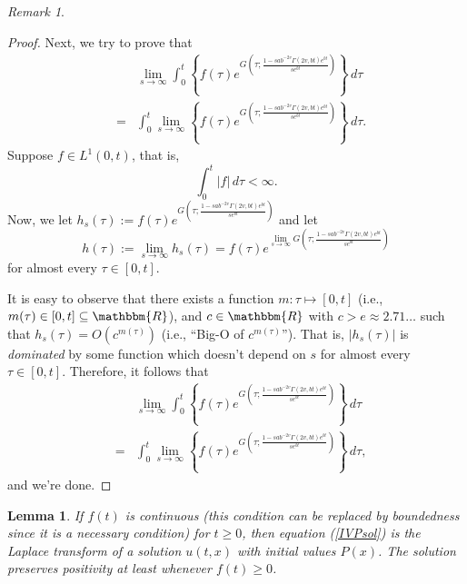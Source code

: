 \documentclass[preprint, 12pt]{elsarticle}
\numberwithin{equation}{section}
\theoremstyle{plain}
\newtheorem{lemma}{Lemma}[section]
\theoremstyle{remark}
\newtheorem{remark}{Remark}[section]
\newcommand{\assign}{:=}
\newcommand{\nocomma}{}
\begin{document}
\begin{remark}
\begin{proof}
Next, we try to prove that
\begin{eqnarray*} 
& & \lim_{s \rightarrow \infty} \int_0^t \left\{ f (\tau) e^{G \left( \tau ; \frac{1 - s a b^{- 2 v} \Gamma (2 v \nocomma, b t) e^{b t}}{s e^{bt}} \right)} \right\}\, d \tau\\ 
& = & \int_0^t \lim_{s \rightarrow \infty} \left\{ f (\tau) e^{G \left( \tau ; \frac{1 - s a b^{- 2 v} \Gamma (2 v \nocomma, b t) e^{b t}}{s e^{bt}} \right)} \right\}\, d \tau .
\end{eqnarray*}
Suppose $f \in L^1 (0, t)$, that is,
\[ \int_0^t | f |\, d \tau < \infty . \]
Now, we let $h_s (\tau) \assign f (\tau) e^{G \left( \tau ; \frac{1 - s a b^{- 2 v} \Gamma (2 v \nocomma, b t) e^{b t}}{s e^{bt}} \right)}$ and let
\[ h (\tau) \assign \lim_{s \rightarrow \infty} h_s (\tau) = f (\tau) e^{\lim_{s \rightarrow \infty} G \left( \tau ; \frac{1 - s a b^{- 2 v} \Gamma (2 v \nocomma, b t) e^{b t}}{s e^{bt}} \right)} \]
for almost every $\tau \in [0, t]$.
  
It is easy to observe that there exists a function $m : \tau \mapsto [0, t]$ (i.e., $m (\tau) \in [0, t] \subseteq \mathbbm{R}$), and $c \in \mathbbm{R}$ with $c > e \approx 2.71 \ldots$ such that $\displaystyle{h_s (\tau) = O (c^{m (\tau)})}$ (i.e., ``Big-O of $\displaystyle{c^{m (\tau)}}$''). That is, $| h_s (\tau) |$ is \emph{dominated} by some function which doesn't depend on $s$ for almost every $\tau \in [0, t]$. Therefore, it follows that
\begin{eqnarray*} 
& & \lim_{s \rightarrow \infty} \int_0^t \left\{ f (\tau) e^{G \left( \tau ; \frac{1 - s a b^{- 2 v} \Gamma (2 v \nocomma, b t) e^{b t}}{s e^{bt}} \right)} \right\}\, d \tau\\ 
& = & \int_0^t \lim_{s \rightarrow \infty} \left\{ f (\tau) e^{G \left( \tau ; \frac{1 - s a b^{- 2 v} \Gamma (2 v \nocomma, b t) e^{b t}}{s e^{bt}} \right)} \right\}\, d \tau,
\end{eqnarray*}
and we're done.
\end{proof}
\end{remark}

\begin{lemma} \label{lemma3}
If $f (t)$ is continuous (this condition can be replaced by boundedness since it is a necessary condition) for $t \geqslant 0$, then equation (\ref{IVPsol}) is the Laplace transform of a solution $u (t, x)$ with initial values $P (x)$. The solution preserves positivity at least whenever $f (t) \geqslant 0$.
\end{lemma}
\end{document}
